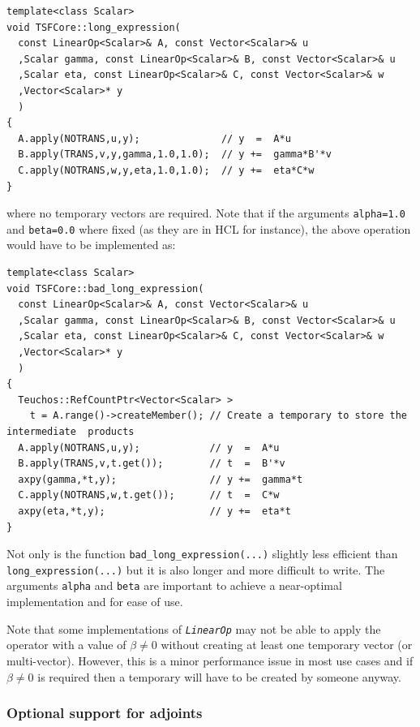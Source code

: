 {\scriptsize\begin{verbatim}
template<class Scalar>
void TSFCore::long_expression(
  const LinearOp<Scalar>& A, const Vector<Scalar>& u
  ,Scalar gamma, const LinearOp<Scalar>& B, const Vector<Scalar>& u
  ,Scalar eta, const LinearOp<Scalar>& C, const Vector<Scalar>& w
  ,Vector<Scalar>* y
  )
{
  A.apply(NOTRANS,u,y);              // y  =  A*u
  B.apply(TRANS,v,y,gamma,1.0,1.0);  // y +=  gamma*B'*v
  C.apply(NOTRANS,w,y,eta,1.0,1.0);  // y +=  eta*C*w
}
\end{verbatim}}

{}\noindent{}where no temporary vectors are required.  Note that if
the arguments {}\texttt{alpha=1.0} and {}\texttt{beta=0.0} where fixed
(as they are in HCL for instance), the above operation would have to
be implemented as:

{\scriptsize\begin{verbatim}
template<class Scalar>
void TSFCore::bad_long_expression(
  const LinearOp<Scalar>& A, const Vector<Scalar>& u
  ,Scalar gamma, const LinearOp<Scalar>& B, const Vector<Scalar>& u
  ,Scalar eta, const LinearOp<Scalar>& C, const Vector<Scalar>& w
  ,Vector<Scalar>* y
  )
{
  Teuchos::RefCountPtr<Vector<Scalar> >
    t = A.range()->createMember(); // Create a temporary to store the intermediate  products
  A.apply(NOTRANS,u,y);            // y  =  A*u
  B.apply(TRANS,v,t.get());        // t  =  B'*v
  axpy(gamma,*t,y);                // y +=  gamma*t
  C.apply(NOTRANS,w,t.get());      // t  =  C*w
  axpy(eta,*t,y);                  // y +=  eta*t
}
\end{verbatim}}

Not only is the function {}\texttt{bad\-\_long\-\_expression(\-...)}
slightly less efficient than {}\texttt{long\-\_expression(\-...)} but
it is also longer and more difficult to write.  The arguments
{}\texttt{alpha} and {}\texttt{beta} are important to achieve a
near-optimal implementation and for ease of use.

Note that some implementations of {}\texttt{\textit{LinearOp}} may not
be able to apply the operator with a value of $\beta {}\ne 0$ without
creating at least one temporary vector (or multi-vector).  However,
this is a minor performance issue in most use cases and if $\beta
{}\ne 0$ is required then a temporary will have to be created by
someone anyway.

%
\subsubsection{Optional support for adjoints}
\label{tsfcore:sec:linear_op_adjoints}
%

